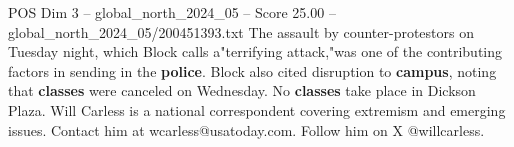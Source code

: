 \begin{textsample}{POS Dim 3 – global\_north\_2024\_05 – Score 25.00 – global\_north\_2024\_05/200451393.txt}
The assault by counter-protestors on Tuesday night, which Block calls a"terrifying attack,"was one of the contributing factors in sending in the \textbf{police}.
Block also cited disruption to \textbf{campus}, noting that \textbf{classes} were canceled on Wednesday.
No \textbf{classes} take place in Dickson Plaza.
Will Carless is a national correspondent covering extremism and emerging issues.
Contact him at wcarless@usatoday.com.
Follow him on X @willcarless.

\end{textsample}
